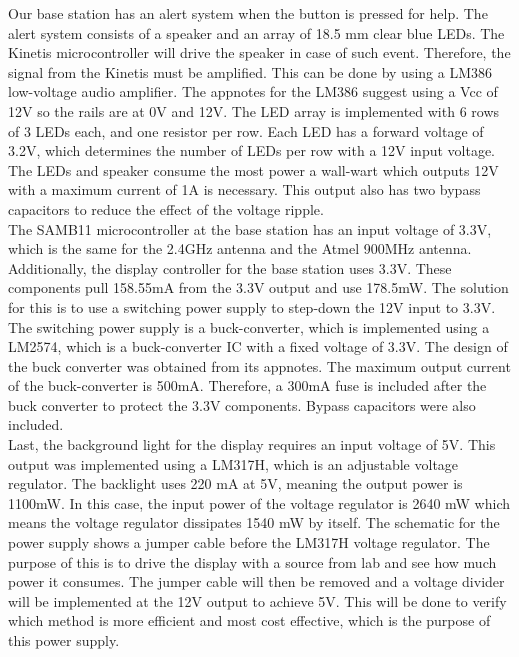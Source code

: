 \documentclass[journal,compsoc]{IEEEtran}
\begin{document}
\noindent Our base station has an alert system when the button is pressed for help.  The alert system consists of a speaker and an array of 18.5 mm clear blue LEDs.  The Kinetis microcontroller will drive the speaker in case of such event.  Therefore, the signal from the Kinetis must be amplified.  This can be done by using a LM386 low-voltage audio amplifier.  The appnotes for the LM386 suggest using a Vcc of 12V so the rails are at 0V and 12V.  The LED array is implemented with 6 rows of 3 LEDs each, and one resistor per row.  Each LED has a forward voltage of 3.2V, which determines the number of LEDs per row with a 12V input voltage.  The LEDs and speaker consume the most power a wall-wart which outputs 12V with a maximum current of 1A is necessary.  This output also has two bypass capacitors to reduce the effect of the voltage ripple.\\

\noindent The SAMB11 microcontroller at the base station has an input voltage of 3.3V, which is the same for the 2.4GHz antenna and the Atmel 900MHz antenna.  Additionally, the display controller for the base station uses 3.3V.  These components pull 158.55mA from the 3.3V output and use 178.5mW.  The solution for this is to use a switching power supply to step-down the 12V input to 3.3V.  The switching power supply is a buck-converter, which is implemented using a LM2574, which is a buck-converter IC with a fixed voltage of 3.3V.  The design of the buck converter was obtained from its appnotes.  The maximum output current of the buck-converter is 500mA.  Therefore, a 300mA fuse is included after the buck converter to protect the 3.3V components.  Bypass capacitors were also included.\\

\noindent Last, the background light for the display requires an input voltage of 5V.  This output was implemented using a LM317H, which is an adjustable voltage regulator.  The backlight uses 220 mA at 5V, meaning the output power is 1100mW.  In this case, the input power of the voltage regulator is 2640 mW which means the voltage regulator dissipates 1540 mW by itself.  The schematic for the power supply shows a jumper cable before the LM317H voltage regulator.  The purpose of this is to drive the display with a source from lab and see how much power it consumes.  The jumper cable will then be removed and a voltage divider will be implemented at the 12V output to achieve 5V.  This will be done to verify which method is more efficient and most cost effective, which is the purpose of this power supply.\\
\end{document}
